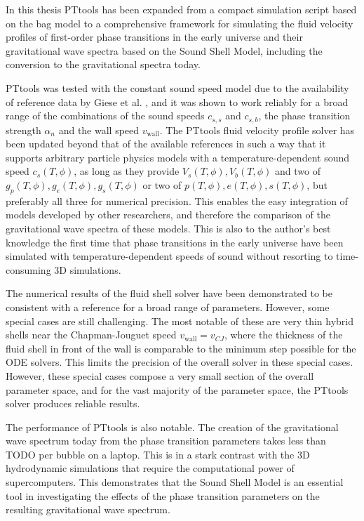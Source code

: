 In this thesis PTtools has been expanded from a compact simulation script based on the bag model
to a comprehensive framework for simulating the fluid velocity profiles of first-order phase transitions in the early universe
and their gravitational wave spectra based on the Sound Shell Model,
including the conversion to the gravitational spectra today.

PTtools was tested with the constant sound speed model due to the availability of reference data by Giese et al. \cite{giese_2021},
and it was shown to work reliably for a broad range of the combinations of the sound speeds $c_{s,s}$ and $c_{s,b}$, the phase transition strength $\alpha_n$ and the wall speed $v_\text{wall}$.
The PTtools fluid velocity profile solver has been updated beyond that of the available references in such a way
that it supports arbitrary particle physics models with a temperature-dependent sound speed $c_s(T,\phi)$,
as long as they provide $V_s(T,\phi), V_b(T,\phi)$ and two of $g_p(T,\phi), g_e(T,\phi), g_s(T,\phi)$ or two of $p(T,\phi), e(T,\phi), s(T,\phi)$, but preferably all three for numerical precision.
This enables the easy integration of models developed by other researchers,
and therefore the comparison of the gravitational wave spectra of these models.
This is also to the author's best knowledge the first time that phase transitions in the early universe have been simulated with temperature-dependent speeds of sound without resorting to time-consuming 3D simulations.

The numerical results of the fluid shell solver have been demonstrated to be consistent with a reference
for a broad range of parameters.
However, some special cases are still challenging.
The most notable of these are very thin hybrid shells near the Chapman-Jouguet speed $v_\text{wall} = v_{CJ}$,
where the thickness of the fluid shell in front of the wall is comparable to the minimum step possible for the ODE solvers.
This limits the precision of the overall solver in these special cases.
However, these special cases compose a very small section of the overall parameter space,
and for the vast majority of the parameter space,
the PTtools solver produces reliable results.

The performance of PTtools is also notable.
The creation of the gravitational wave spectrum today from the phase transition parameters takes less than TODO per bubble on a laptop.
This is in a stark contrast with the 3D hydrodynamic simulations that require the computational power of supercomputers.
This demonstrates that the Sound Shell Model is an essential tool in investigating
the effects of the phase transition parameters on the resulting gravitational wave spectrum.

